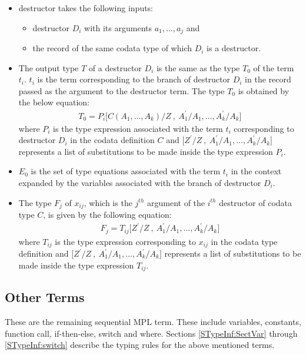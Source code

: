 \documentclass[11pt]{article}
\begin{document}
\begin{itemize}
  \item {\sf destructor} takes the following inputs:
   \begin{itemize}
     \item destructor ${D_i}$ with its arguments ${a_1,\ldots,a_j}$ and 
     \item the record of the same codata type of which ${D_i}$ is a destructor.
   \end{itemize}
  \item The output type ${T}$ of a destructor ${D_i}$ is the same as the type ${T_0}$ of the term ${t_i}$. ${t_i}$ is the term corresponding to the branch of destructor ${D_i}$ in the record passed as the argument to the {\sf destructor} term. The type ${T_0}$ is obtained by the below equation:
  \begin{align*}
   T_0 = P_{i}\Big[C(A_1,\ldots,A_k)/Z~,~A_1^\prime/A_1,\ldots,A_k^\prime/A_k \Big]
  \end{align*}
  where ${P_i}$ is the type expression associated with the term ${t_i}$ corresponding to destructor ${D_i}$ in the codata definition ${C}$ and ${\big[Z^\prime/Z~,~A_1^\prime/A_1,\ldots,A_k^\prime/A_k\big]}$ represents a list of substitutions to be made inside the type expression ${P_i}$. 
  \item ${E_0}$ is the set of type equations associated with the term $t_i$ in the context expanded by the variables associated with the branch of destructor ${D_i}$.

\item The type ${F_{j}}$ of ${x_{ij}}$, which is the ${j^{th}}$ argument of the ${i^{th}}$ destructor of codata type ${C}$, is given by the following equation:
\begin{align*}
F_{j}= T_{ij} \Big[Z^\prime/Z~,~A_1^\prime/A_1,\ldots,A_k^\prime/A_k\Big]
\end{align*}
where ${T_{ij}}$ is the type expression corresponding to ${x_{ij}}$ in the codata type definition and ${\big[Z^\prime/Z~,~A_1^\prime/A_1,\ldots,A_k^\prime/A_k\big]}$ represents a list of substitutions to be made inside the type expression ${T_{ij}}$.
\end{itemize}

\subsection {Other Terms}
These are the remaining sequential MPL term. These include {\sf variables, constants, function call, if-then-else, switch} and {\sf where}. Sections \ref {STypeInf:SectVar} through \ref {STypeInf:switch} describe the typing rules for the above mentioned terms.
\end{document}
